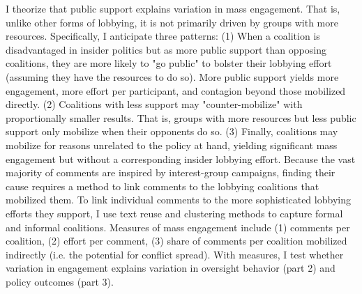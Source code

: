 I theorize that public support explains variation in mass engagement. That is, unlike other forms of lobbying, it is not primarily driven by groups with more resources. Specifically, I anticipate three patterns:
(1) When a coalition is disadvantaged in insider politics but as more public support than opposing coalitions, they are more likely to "go public" to bolster their lobbying effort (assuming they have the resources to do so). More public support yields more engagement, more effort per participant, and contagion beyond those mobilized directly. (2) Coalitions with less support may "counter-mobilize" with proportionally smaller results. That is, groups with more resources but less public support only mobilize when their opponents do so. (3) Finally, coalitions may mobilize for reasons unrelated to the policy at hand, yielding significant mass engagement but without a corresponding insider lobbying effort. 
Because the vast majority of comments are inspired by interest-group campaigns, finding their cause requires a method to link comments to the lobbying coalitions that mobilized them.  
To link individual comments to the more sophisticated lobbying efforts they support, I use text reuse and clustering methods to capture formal and informal coalitions.
Measures of mass engagement include 
(1) comments per coalition, %
(2) effort per comment, %
(3) share of comments per coalition mobilized indirectly (i.e. the potential for conflict spread).
With measures, I test whether variation in engagement explains variation in oversight behavior (part 2) and policy outcomes (part 3).

